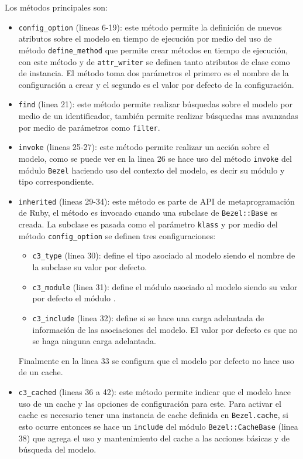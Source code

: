Los métodos principales son:
\begin{itemize}
  \item \texttt{config\_option} (lineas 6-19): este método permite la definición
    de nuevos atributos sobre el modelo en tiempo de ejecución por medio del uso
    de método \texttt{define\_method} que permite crear métodos en tiempo
    de ejecución, con este método y de \texttt{attr\_writer} se definen tanto
    atributos de clase como de instancia. El método toma dos parámetros
    el primero es el nombre de la configuración a crear y el segundo
    es el valor por defecto de la configuración.
  \item \texttt{find} (linea 21): este método permite realizar búsquedas sobre
    el modelo por medio de un identificador, también permite realizar búsquedas
    mas avanzadas por medio de parámetros como \texttt{filter}.
  \item \texttt{invoke} (lineas 25-27): este método permite realizar
    un acción sobre el modelo, como se puede ver en la linea 26 se hace uso del
    método \texttt{invoke} del módulo \texttt{Bezel} haciendo
    uso del contexto del modelo, es decir su módulo y tipo correspondiente.
  \item \texttt{inherited} (lineas 29-34): este método es parte de API de
    metaprogramación de Ruby, el método es invocado cuando una subclase de
    \texttt{Bezel::Base} es creada. La subclase es pasada como el parámetro
    \texttt{klass} y por medio del método \texttt{config\_option} se definen
    tres configuraciones:
    \begin{itemize}
    \item \texttt{c3\_type} (linea 30): define el tipo asociado al modelo
      siendo el nombre de la subclase su valor por defecto.
    \item \texttt{c3\_module} (linea 31): define el módulo asociado al modelo
      siendo su valor por defecto el módulo .
    \item \texttt{c3\_include} (linea 32): define si se hace una carga adelantada
      de información de las asociaciones del modelo. El valor por defecto es que
      no se haga ninguna carga adelantada.
    \end{itemize}
    Finalmente en la linea 33 se configura que el modelo por defecto no hace uso
    de un cache.
  \item \texttt{c3\_cached} (lineas 36 a 42): este método permite indicar
    que el modelo hace uso de un cache y las opciones de configuración para este.
    Para activar el cache es necesario tener una instancia de cache definida en
    \texttt{Bezel.cache}, si esto ocurre entonces se hace un \texttt{include}
    del módulo \texttt{Bezel::CacheBase} (linea 38) que agrega el uso y
    mantenimiento del cache a las acciones básicas y de búsqueda del modelo.
\end{itemize}

